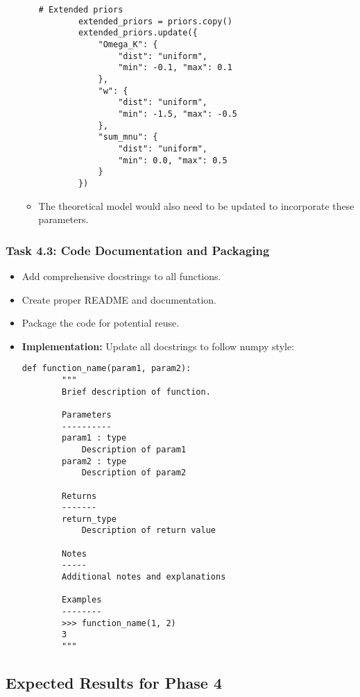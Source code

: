 \documentclass[11pt]{article}
\begin{document}
\begin{enumerate}
\begin{itemize}
\begin{lstlisting}[basicstyle=\small\ttfamily]
        # Extended priors
        extended_priors = priors.copy()
        extended_priors.update({
            "Omega_K": {
                "dist": "uniform",
                "min": -0.1, "max": 0.1
            },
            "w": {
                "dist": "uniform",
                "min": -1.5, "max": -0.5
            },
            "sum_mnu": {
                "dist": "uniform",
                "min": 0.0, "max": 0.5
            }
        })
        \end{lstlisting}
        
        \item The theoretical model would also need to be updated to incorporate these parameters.
    \end{itemize}
\end{enumerate}

\subsubsection{Task 4.3: Code Documentation and Packaging}

\begin{itemize}
    \item Add comprehensive docstrings to all functions.
    \item Create proper README and documentation.
    \item Package the code for potential reuse.
    
    \item \textbf{Implementation:} Update all docstrings to follow numpy style:
    \begin{lstlisting}[basicstyle=\small\ttfamily]
    def function_name(param1, param2):
        """
        Brief description of function.
        
        Parameters
        ----------
        param1 : type
            Description of param1
        param2 : type
            Description of param2
            
        Returns
        -------
        return_type
            Description of return value
            
        Notes
        -----
        Additional notes and explanations
        
        Examples
        --------
        >>> function_name(1, 2)
        3
        """
    \end{lstlisting}
\end{itemize}

\subsection{Expected Results for Phase 4}
\end{document}
